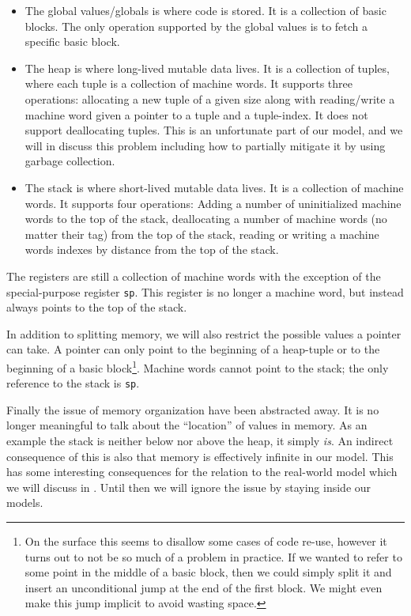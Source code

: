 \begin{itemize}
\item The global values/globals is where code is stored. It is a collection of
  basic blocks. The only operation supported by the global values is to fetch a
  specific basic block.
\item The heap is where long-lived mutable data lives. It is a collection of
  tuples, where each tuple is a collection of machine words. It supports three
  operations: allocating a new tuple of a given size along with reading/write a
  machine word given a pointer to a tuple and a tuple-index. It does not support
  deallocating tuples. This is an unfortunate part of our model, and we will in
   discuss this problem including how to partially mitigate
  it by using garbage collection.
\item The stack is where short-lived mutable data lives. It is a collection of
  machine words. It supports four operations: Adding a number of uninitialized
  machine words to the top of the stack, deallocating a number of machine words
  (no matter their tag) from the top of the stack, reading or writing a machine
  words indexes by distance from the top of the stack.
\end{itemize}

The registers are still a collection of machine words with the exception of the
special-purpose register \texttt{sp}. This register is no longer a machine word,
but instead always points to the top of the stack.

In addition to splitting memory, we will also restrict the possible values a
pointer can take. A pointer can only point to the beginning of a heap-tuple or
to the beginning of a basic block\footnote{On the surface this seems to disallow
  some cases of code re-use, however it turns out to not be so much of a problem
  in practice. If we wanted to refer to some point in the middle of a basic
  block, then we could simply split it and insert an unconditional jump at the
  end of the first block. We might even make this jump implicit to avoid wasting
  space.}. Machine words cannot point to the stack; the only reference to the
stack is \texttt{sp}.

Finally the issue of memory organization have been abstracted away. It is no
longer meaningful to talk about the ``location'' of values in memory. As an
example the stack is neither below nor above the heap, it simply \emph{is}.  An
indirect consequence of this is also that memory is effectively infinite in our
model. This has some interesting consequences for the relation to the real-world
model which we will discuss in . Until then we will ignore
the issue by staying inside our models.

